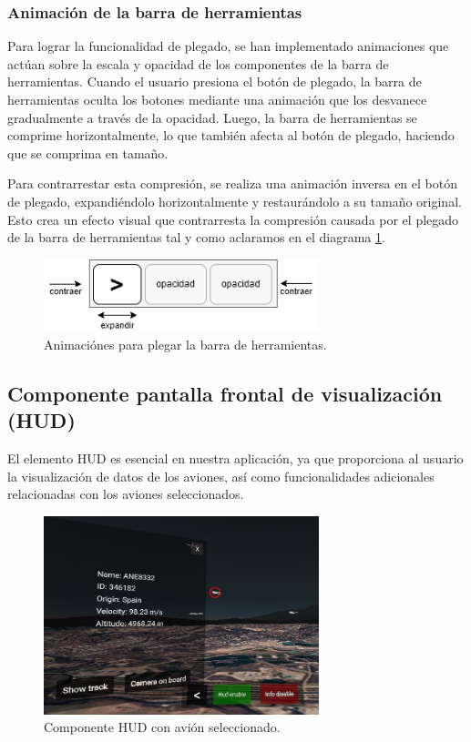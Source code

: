 \documentclass[a4paper, 11pt]{book}
\begin{document}
\subsubsection{Animación de la barra de herramientas}
\label{subsec:animationToolbar}
Para lograr la funcionalidad de plegado, se han implementado animaciones que actúan sobre la escala y opacidad de los componentes de la barra de herramientas. Cuando el usuario presiona el botón de plegado, la barra de herramientas oculta los botones mediante una animación que los desvanece gradualmente a través de la opacidad. Luego, la barra de herramientas se comprime horizontalmente, lo que también afecta al botón de plegado, haciendo que se comprima en tamaño.

Para contrarrestar esta compresión, se realiza una animación inversa en el botón de plegado, expandiéndolo horizontalmente y restaurándolo a su tamaño original. Esto crea un efecto visual que contrarresta la compresión causada por el plegado de la barra de herramientas tal y como aclaramos en el diagrama \ref{fig:animationPlegado}.
\begin{figure}[H]
  \centering
  \includegraphics[width=8cm, keepaspectratio]{img/plegadoToolbar.drawio.png}
  \caption{Animaciónes para plegar la barra de herramientas.}
  \label{fig:animationPlegado}
\end{figure}
\subsection{Componente pantalla frontal de visualización (HUD)}
\label{subsec:hud}
El elemento HUD es esencial en nuestra aplicación, ya que proporciona al usuario la visualización de datos de los aviones, así como funcionalidades adicionales relacionadas con los aviones seleccionados.
\begin{figure}[H]
  \centering
  \includegraphics[width=8cm, keepaspectratio]{img/hud.jpg}
  \caption{Componente HUD con avión seleccionado.}
  \label{fig:hud}
\end{figure}
\end{document}
